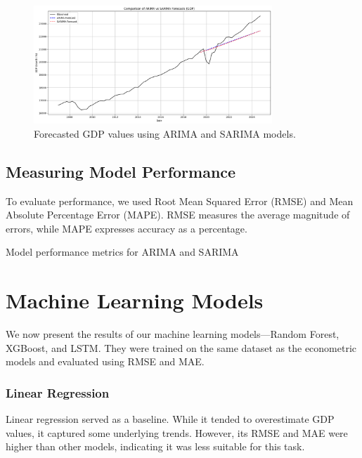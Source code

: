 \begin{figure}[ht]
    \centering
    \includegraphics[width=0.8\textwidth]{../images/us_gdp_econometric_models.png}
    \caption{Forecasted GDP values using ARIMA and SARIMA models.}
    \label{fig:gdp_forecast}
\end{figure}

\subsection{Measuring Model Performance}
\label{subsubsec:model_performance}

To evaluate performance, we used Root Mean Squared Error (RMSE) and Mean Absolute Percentage Error (MAPE). RMSE measures the average magnitude of errors, while MAPE expresses accuracy as a percentage.

\begin{table}[ht]
    \centering
    \caption{Model performance metrics for ARIMA and SARIMA}
    
\end{table}

\section{Machine Learning Models}
\label{subsec:machine_learning_models}

We now present the results of our machine learning models—Random Forest, XGBoost, and LSTM. They were trained on the same dataset as the econometric models and evaluated using RMSE and MAE.

\subsubsection{Linear Regression}
\label{subsubsec:linear_regression}

Linear regression served as a baseline. While it tended to overestimate GDP values, it captured some underlying trends. However, its RMSE and MAE were higher than other models, indicating it was less suitable for this task.

